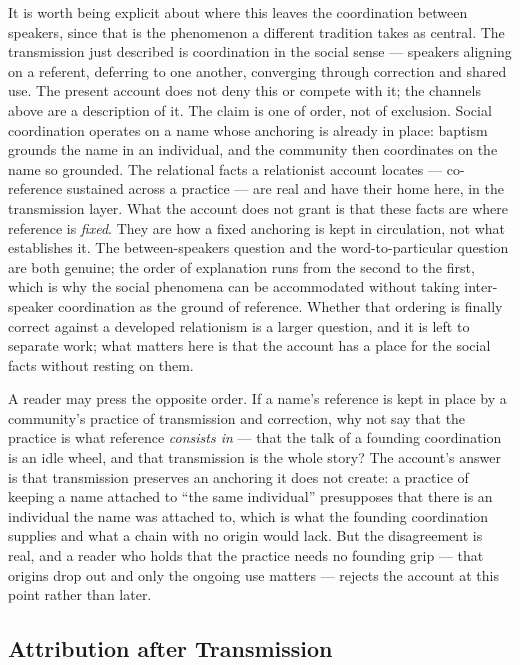 \documentclass[12pt,a4paper]{article}
\begin{document}
It is worth being explicit about where this leaves the coordination between speakers, since that is the phenomenon a different tradition takes as central. The transmission just described is coordination in the social sense --- speakers aligning on a referent, deferring to one another, converging through correction and shared use. The present account does not deny this or compete with it; the channels above are a description of it. The claim is one of order, not of exclusion. Social coordination operates on a name whose anchoring is already in place: baptism grounds the name in an individual, and the community then coordinates on the name so grounded. The relational facts a relationist account locates --- co-reference sustained across a practice --- are real and have their home here, in the transmission layer. What the account does not grant is that these facts are where reference is \emph{fixed}. They are how a fixed anchoring is kept in circulation, not what establishes it. The between-speakers question and the word-to-particular question are both genuine; the order of explanation runs from the second to the first, which is why the social phenomena can be accommodated without taking inter-speaker coordination as the ground of reference. Whether that ordering is finally correct against a developed relationism is a larger question, and it is left to separate work; what matters here is that the account has a place for the social facts without resting on them.

A reader may press the opposite order. If a name's reference is kept in place by a community's practice of transmission and correction, why not say that the practice is what reference \emph{consists in} --- that the talk of a founding coordination is an idle wheel, and that transmission is the whole story? The account's answer is that transmission preserves an anchoring it does not create: a practice of keeping a name attached to ``the same individual'' presupposes that there is an individual the name was attached to, which is what the founding coordination supplies and what a chain with no origin would lack. But the disagreement is real, and a reader who holds that the practice needs no founding grip --- that origins drop out and only the ongoing use matters --- rejects the account at this point rather than later.

\subsection{Attribution after Transmission}\label{attribution-after-transmission}
\end{document}
